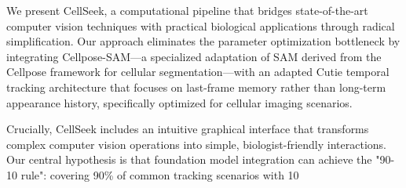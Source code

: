 \documentclass[../cellseek_paper.tex]{subfiles}
\begin{document}
We present CellSeek, a computational pipeline that bridges state-of-the-art computer vision techniques with practical biological applications through radical simplification. Our approach eliminates the parameter optimization bottleneck by integrating Cellpose-SAM—a specialized adaptation of SAM derived from the Cellpose framework for cellular segmentation—with an adapted Cutie temporal tracking architecture that focuses on last-frame memory rather than long-term appearance history, specifically optimized for cellular imaging scenarios.

Crucially, CellSeek includes an intuitive graphical interface that transforms complex computer vision operations into simple, biologist-friendly interactions. Our central hypothesis is that foundation model integration can achieve the "90-10 rule": covering 90\% of common tracking scenarios with 10%
\end{document}

